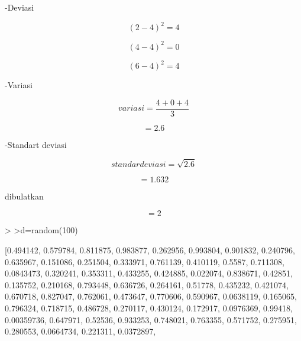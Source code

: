 \documentclass{article}
\begin{document}
\begin{eulernotebook}
\begin{eulercomment}
\begin{eulercomment}
\begin{eulercomment}
-Deviasi\\
\end{eulercomment}
\begin{eulerformula}
\[
(2-4)^{2} = 4
\]
\end{eulerformula}
\begin{eulerformula}
\[
(4-4)^{2} = 0
\]
\end{eulerformula}
\begin{eulerformula}
\[
(6-4)^{2} = 4
\]
\end{eulerformula}
\begin{eulercomment}
-Variasi\\
\end{eulercomment}
\begin{eulerformula}
\[
variasi = \frac{4+0+4}{3}
\]
\end{eulerformula}
\begin{eulerformula}
\[
= 2.6
\]
\end{eulerformula}
\begin{eulercomment}
-Standart deviasi\\
\end{eulercomment}
\begin{eulerformula}
\[
standar deviasi= \sqrt{2.6}
\]
\end{eulerformula}
\begin{eulerformula}
\[
= 1.632
\]
\end{eulerformula}
\begin{eulercomment}
dibulatkan\\
\end{eulercomment}
\begin{eulerformula}
\[
= 2
\]
\end{eulerformula}
\begin{eulerprompt}
> 
>d=random(100)
\end{eulerprompt}
\begin{euleroutput}
  [0.494142,  0.579784,  0.811875,  0.983877,  0.262956,  0.993804,
  0.901832,  0.240796,  0.635967,  0.151086,  0.251504,  0.333971,
  0.761139,  0.410119,  0.5587,  0.711308,  0.0843473,  0.320241,
  0.353311,  0.433255,  0.424885,  0.022074,  0.838671,  0.42851,
  0.135752,  0.210168,  0.793448,  0.636726,  0.264161,  0.51778,
  0.435232,  0.421074,  0.670718,  0.827047,  0.762061,  0.473647,
  0.770606,  0.590967,  0.0638119,  0.165065,  0.796324,  0.718715,
  0.486728,  0.270117,  0.430124,  0.172917,  0.0976369,  0.99418,
  0.00359736,  0.647971,  0.52536,  0.933253,  0.748021,  0.763355,
  0.571752,  0.275951,  0.280553,  0.0664734,  0.221311,  0.0372897,

\end{euleroutput}
\end{eulercomment}
\end{eulercomment}
\end{eulernotebook}
\end{document}
